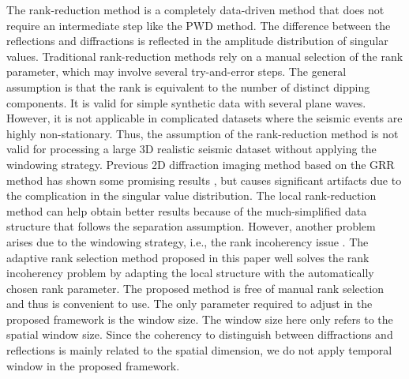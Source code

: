 The rank-reduction method is a completely data-driven method that does not require an intermediate step like the PWD method. The difference between the reflections and diffractions is reflected in the amplitude distribution of singular values. Traditional rank-reduction methods rely on a manual selection of the rank parameter, which may involve several try-and-error steps. The general assumption is that the rank is equivalent to the number of distinct dipping components. It is valid for simple synthetic data with several plane waves. However, it is not applicable in complicated datasets where the seismic events are highly non-stationary. Thus, the assumption of the rank-reduction method is not valid for processing a large 3D realistic seismic dataset without applying the windowing strategy. Previous 2D diffraction imaging method based on the GRR method has shown some promising results \cite[]{2020Diffraction}, but causes significant artifacts due to the complication in the singular value distribution. The local rank-reduction method can help obtain better results because of the much-simplified data structure that follows the separation assumption. However, another problem arises due to the windowing strategy, i.e., the rank incoherency issue \cite[]{shaohuan2017gji,yangkang2017ieee}. The adaptive rank selection method proposed in this paper well solves the rank incoherency problem by adapting the local structure with the automatically chosen rank parameter. The proposed method is free of manual rank selection and thus is convenient to use. The only parameter required to adjust in the proposed framework is the window size. The window size here only refers to the spatial window size. Since the coherency to distinguish between diffractions and reflections is mainly related to the spatial dimension, we do not apply temporal window in the proposed framework. 

